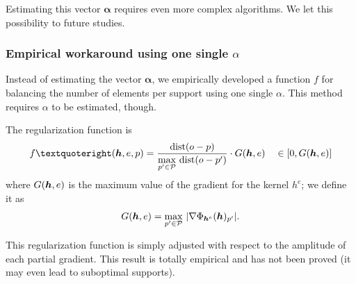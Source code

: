 \noindent
Estimating this vector $\bm{\alpha}$ requires even more complex algorithms. We let this possibility to future studies.

\subsubsection{Empirical workaround using one single $\alpha$}
Instead of estimating the vector $\bm{\alpha}$, we empirically developed a function $f$ for balancing the number of elements per support using one single $\alpha$. This method requires $\alpha$ to be estimated, though.

\noindent
The regularization function is
\begin{equation}
f’(\h,e,p) = \frac{\text{dist}(o-p)}{\underset{p' \in \P}{\max}~\text{dist}(o-p')} \cdot G(\h,e) \quad \in [0,G(\h,e)]\label{eq_regularize2}
\end{equation}
where $G(\bm{h},e)$ is the maximum value of the gradient for the kernel $h^e$; we define it as 
\begin{equation*} 
G(\bm{h},e)=\underset{p' \in \mathcal P}{\max}~ |\nabla \Phi_{\bm{h}^e}(\bm{h})_{p'}|.
\end{equation*}

\noindent
This regularization function is simply adjusted with respect to the amplitude of each partial gradient. This result is totally empirical and has not been proved (it may even lead to suboptimal supports).


